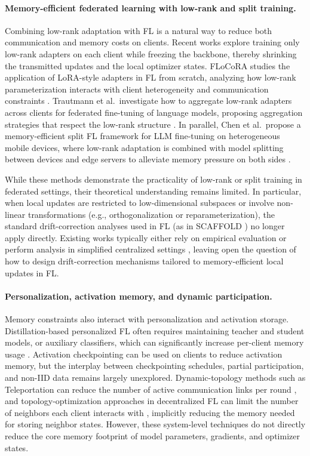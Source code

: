 \paragraph{Memory-efficient federated learning with low-rank and split training.}
Combining low-rank adaptation with FL is a natural way to reduce both communication and memory costs on clients. Recent works explore training only low-rank adapters on each client while freezing the backbone, thereby shrinking the transmitted updates and the local optimizer states. FLoCoRA studies the application of LoRA-style adapters in FL from scratch, analyzing how low-rank parameterization interacts with client heterogeneity and communication constraints \cite{ribeiro2024flocora}. Trautmann et al.\ investigate how to aggregate low-rank adapters across clients for federated fine-tuning of language models, proposing aggregation strategies that respect the low-rank structure \cite{trautmann2024aggregateLora}. In parallel, Chen et al.\ propose a memory-efficient split FL framework for LLM fine-tuning on heterogeneous mobile devices, where low-rank adaptation is combined with model splitting between devices and edge servers to alleviate memory pressure on both sides \cite{chen2025memsplitfl}.

While these methods demonstrate the practicality of low-rank or split training in federated settings, their theoretical understanding remains limited. In particular, when local updates are restricted to low-dimensional subspaces or involve non-linear transformations (e.g., orthogonalization or reparameterization), the standard drift-correction analyses used in FL (as in SCAFFOLD \cite{karimireddy2020scaffold}) no longer apply directly. Existing works typically either rely on empirical evaluation or perform analysis in simplified centralized settings \cite{zhao2024galore,he2024subspaceLLM}, leaving open the question of how to design drift-correction mechanisms tailored to memory-efficient local updates in FL.

\paragraph{Personalization, activation memory, and dynamic participation.}
Memory constraints also interact with personalization and activation storage. Distillation-based personalized FL often requires maintaining teacher and student models, or auxiliary classifiers, which can significantly increase per-client memory usage \cite{chen2024spectralcodistill,xie2024MHpFLID}. Activation checkpointing \cite{chen2016sublinear} can be used on clients to reduce activation memory, but the interplay between checkpointing schedules, partial participation, and non-IID data remains largely unexplored. Dynamic-topology methods such as Teleportation can reduce the number of active communication links per round \cite{takezawa2025teleportation}, and topology-optimization approaches in decentralized FL can limit the number of neighbors each client interacts with \cite{jiang2025dfedmq}, implicitly reducing the memory needed for storing neighbor states. However, these system-level techniques do not directly reduce the core memory footprint of model parameters, gradients, and optimizer states.

